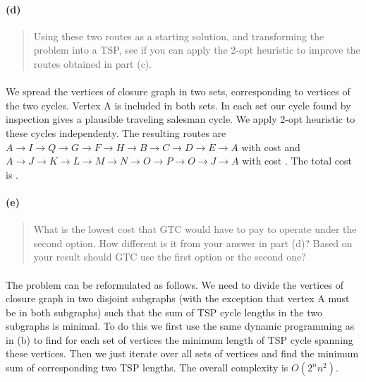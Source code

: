 \paragraph{(d)}
\begin{quote}
Using these two routes as a starting solution, and transforming the problem into
a TSP, see if you can apply the 2-opt heuristic to improve the routes obtained in
part (c).
\end{quote}

\paragraph{}
We spread the vertices of closure graph in two sets, corresponding to vertices of the two cycles. Vertex A is included in both sets. In each set our cycle found by inspection gives a plausible traveling salesman cycle. We apply 2-opt heuristic to these cycles independenty. The resulting routes are $ A \rightarrow I \rightarrow Q \rightarrow G \rightarrow F \rightarrow H \rightarrow B \rightarrow C \rightarrow D \rightarrow E \rightarrow A $ with cost  and $ A \rightarrow J \rightarrow K \rightarrow L \rightarrow M \rightarrow N \rightarrow O \rightarrow P \rightarrow O \rightarrow J \rightarrow A $ with cost . The total cost is .

\paragraph{(e)}
\begin{quote}
What is the lowest cost that GTC would have to pay to operate under the second
option. How different is it from your answer in part (d)? Based on your result
should GTC use the first option or the second one?
\end{quote}

\paragraph{}
The problem can be reformulated as follows. We need to divide the vertices of closure graph in two disjoint subgraphs (with the exception that vertex A must be in both subgraphs) such that the sum of TSP cycle lengths in the two subgraphs is minimal. To do this we first use the same dynamic programming as in (b) to find for each set of vertices the minimum length of TSP cycle spanning these vertices. Then we just iterate over all sets of vertices and find the minimum sum of corresponding two TSP lengths. The overall complexity is $O(2^n n^2)$.

